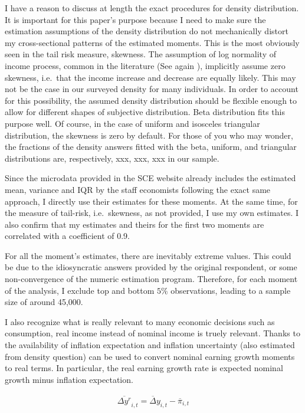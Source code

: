 \documentclass[12pt,notitlepage,onecolumn,aps,pra]{revtex4-1}
\begin{document}
I have a reason to discuss at length the exact procedures for density
distribution. It is important for this paper's purpose because I need to
make sure the estimation assumptions of the density distribution do not
mechanically distort my cross-sectional patterns of the estimated
moments. This is the most obviously seen in the tail risk measure,
skewness. The assumption of log normality of income process, common in
the literature (See again \cite{blundell_consumption_2008}), implicitly
assume zero skewness, i.e.~that the income increase and decrease are
equally likely. This may not be the case in our surveyed density for
many individuals. In order to account for this possibility, the assumed
density distribution should be flexible enough to allow for different
shapes of subjective distribution. Beta distribution fits this purpose
well. Of course, in the case of uniform and isosceles triangular
distribution, the skewness is zero by default. For those of you who may
wonder, the fractions of the density answers fitted with the beta,
uniform, and triangular distributions are, respectively, xxx, xxx, xxx
in our sample.

Since the microdata provided in the SCE website already includes the
estimated mean, variance and IQR by the staff economists following the
exact same approach, I directly use their estimates for these moments.
At the same time, for the measure of tail-risk, i.e.~skewness, as not
provided, I use my own estimates. I also confirm that my estimates and
theirs for the first two moments are correlated with a coefficient of
0.9.

For all the moment's estimates, there are inevitably extreme values.
This could be due to the idiosyncratic answers provided by the original
respondent, or some non-convergence of the numeric estimation program.
Therefore, for each moment of the analysis, I exclude top and bottom
\(5\%\) observations, leading to a sample size of around 45,000.

I also recognize what is really relevant to many economic decisions such
as consumption, real income instead of nominal income is truely
relevant. Thanks to the availability of inflation expectation and
inflation uncertainty (also estimated from density question) can be used
to convert nominal earning growth moments to real terms. In particular,
the real earning growth rate is expected nominal growth minus inflation
expectation.

\begin{eqnarray}
\overline {\Delta y^{r}}_{i,t} = \overline\Delta y_{i,t} - \overline \pi_{i,t}
\end{eqnarray}
\end{document}
